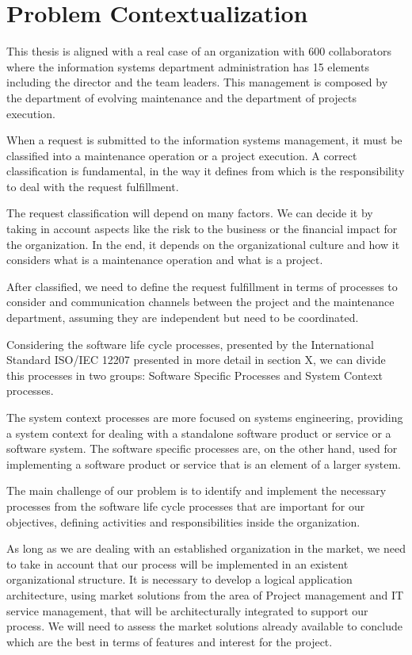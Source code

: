 
% 
% 

\section{Problem Contextualization}

This thesis is aligned with a real case of an organization with 600 collaborators where the information systems department administration has 15 elements including the director and the team leaders. This management is composed by the department of evolving maintenance and the department of projects execution.\par
When a request is submitted to the information systems management, it must be classified into a maintenance operation or a project execution. A correct classification is fundamental, in the way it defines from which is the responsibility to deal with the request fulfillment.\par
The request classification will depend on many factors. We can decide it by taking in account aspects like the risk to the business or the financial impact for the organization. In the end, it depends on the organizational culture and how it considers what is a maintenance operation and what is a project.\par
After classified, we need to define the request fulfillment in terms of processes to consider and communication channels between the project and the maintenance department, assuming they are independent but need to be coordinated.\par
Considering the software life cycle processes, presented by the International Standard ISO/IEC 12207 presented in more detail in section X, we can divide this processes in two groups: Software Specific Processes and System Context processes.\par
The system context processes are more focused on systems engineering, providing a system context for dealing with a standalone software product or service or a software system. The software specific processes are, on the other hand, used for implementing a software product or service that is an element of a larger system. \par 
The main challenge of our problem is to identify and implement the necessary processes from the software life cycle processes that are important for our objectives, defining activities and responsibilities inside the organization.\par
As long as we are dealing with an established organization in the market, we need to take in account that our process will be implemented in an existent organizational structure. It is necessary to develop a logical application architecture, using market solutions from the area of Project management and IT service management, that will be architecturally integrated to support our process. We will need to assess the market solutions already available to conclude which are the best in terms of features and interest for the project. 
